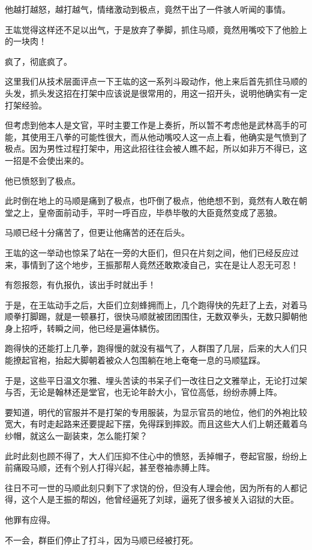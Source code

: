 \begin{multicols}{\theparacolNo}
他越打越怒，越打越气，情绪激动到极点，竟然干出了一件骇人听闻的事情。

王竑觉得这样还不足以出气，于是放弃了拳脚，抓住马顺，竟然用嘴咬下了他脸上的一块肉！

疯了，彻底疯了。

这里我们从技术层面评点一下王竑的这一系列斗殴动作，他上来后首先抓住马顺的头发，抓头发这招在打架中应该说是很常用的，用这一招开头，说明他确实有一定打架经验。

但考虑到他本人是文官，平时主要工作是上奏折，所以暂不考虑他是武林高手的可能，其使用王八拳的可能性很大，而从他动嘴咬人这一点上看，他确实是气愤到了极点。因为男性过程打架中，用这此招往往会被人瞧不起，所以如非万不得已，这一招是不会使出来的。

他已愤怒到了极点。

此时倒在地上的马顺是痛到了极点，也吓倒了极点，他绝想不到，竟然有人敢在朝堂之上，皇帝面前动手，平时一呼百应，毕恭毕敬的大臣竟然变成了恶狼。

马顺已经十分痛苦了，但更让他痛苦的还在后头。

王竑的这一举动也惊呆了站在一旁的大臣们，但只在片刻之间，他们已经反应过来，事情到了这个地步，王振那帮人竟然还敢欺凌自己，实在是让人忍无可忍！

有怨报怨，有仇报仇，该出手时就出手！

于是，在王竑动手之后，大臣们立刻蜂拥而上，几个跑得快的先赶了上去，对着马顺拳打脚踢，就是一顿暴打，很快马顺就被团团围住，无数双拳头，无数只脚朝他身上招呼，转瞬之间，他已经是遍体鳞伤。

跑得快的还能打上几拳，跑得慢的就没有福气了，人群围了几层，后来的大人们只能撩起官袍，抬起大脚朝着被众人包围躺在地上奄奄一息的马顺猛踩。

于是，这些平日温文尔雅、埋头苦读的书呆子们一改往日之文雅举止，无论打过架与否，无论是翰林还是堂官，也无论年龄大小，官位高低，纷纷赤膊上阵。

要知道，明代的官服并不是打架的专用服装，为显示官员的地位，他们的外袍比较宽大，有时走起路来还要提起下摆，免得踩到摔跤。而且这些大人们上朝还戴着乌纱帽，就这么一副装束，怎么能打架？

此时此刻也顾不得了，大人们压抑不住心中的愤怒，丢掉帽子，卷起官服，纷纷上前痛殴马顺，还有个别人打得兴起，甚至卷袖赤膊上阵。

往日不可一世的马顺此刻只剩下了求饶的份，但没有人理会他，因为所有的人都记得，这个人是王振的帮凶，他曾经逼死了刘球，逼死了很多被关入诏狱的大臣。

他罪有应得。

不一会，群臣们停止了打斗，因为马顺已经被打死。


\end{multicols}
